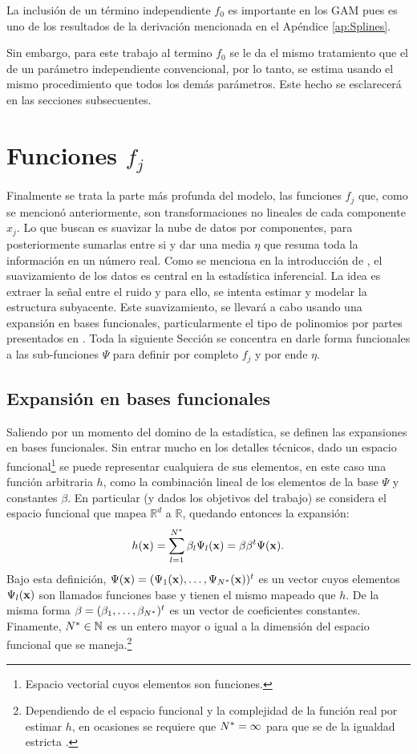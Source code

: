 \documentclass[../Main/Main.tex]{subfiles}
\begin{document}
La inclusión de un término independiente $f_0$ es importante en los GAM pues es uno de los resultados de la derivación mencionada en el Apéndice \ref{ap:Splines}. 


Sin embargo, para este trabajo al termino $f_0$ se le da el mismo tratamiento que el de un parámetro independiente convencional, por lo tanto, se estima usando el mismo procedimiento que todos los demás parámetros. Este hecho se esclarecerá en las secciones subsecuentes. 

\section{Funciones $f_j$} \label{sec:fj}
Finalmente se trata la parte más profunda del modelo, las funciones $f_j$  que, como se mencionó anteriormente, son transformaciones no lineales de cada componente $x_j$. Lo que buscan es suavizar la nube de datos por componentes, para posteriormente sumarlas entre si y dar una media $\eta$ que resuma toda la información en un número real. Como se menciona en la introducción de \citet{hardle2004semiparametric}, el suavizamiento de los datos es central en la estadística inferencial. La idea es extraer la señal entre el ruido y para ello, se intenta estimar y modelar la estructura subyacente. Este suavizamiento, se llevará a cabo usando una expansión en bases funcionales, particularmente el tipo de polinomios por partes presentados en \citet{mallik1998automatic}. Toda la siguiente Sección se concentra en darle forma funcionales a las sub-funciones $\Psi$ para definir por completo $f_j$ y por ende $\eta$. 

\subsection{Expansión en bases funcionales}
Saliendo por un momento del domino de la estadística, se definen las expansiones en bases funcionales. Sin entrar mucho en los detalles técnicos, dado un espacio funcional\footnote{Espacio vectorial cuyos elementos son funciones.} se puede representar cualquiera de sus elementos, en este caso una función arbitraria $h$, como la combinación lineal de los elementos de la base $\Psi$  y constantes $\beta$. En particular (y dados los objetivos del trabajo) se considera el espacio funcional que mapea $\mathbb{R}^d$ a $\mathbb{R}$, quedando entonces la expansión: 
\begin{align} 
	h(\mathbf{x}) = \sum_{l = 1}^{N^*} \beta_l\Psi_l(\mathbf{x}) = \beta{\beta}^t\Psi(\mathbf{x}). \label{ec:ExpansionBases}
\end{align}
Bajo esta definición, $\Psi(\mathbf{x}) = (\Psi_1(\mathbf{x}),\ldots,\Psi_{N^*}(\mathbf{x}))^t$ es un vector cuyos elementos $\Psi_l(\mathbf{x})$ son llamados funciones base y tienen el mismo mapeado que $h$. De la misma forma $\beta = (\beta_1,\ldots,\beta_{N^*})^t$ es un vector de coeficientes constantes. Finamente, $N^*\in\mathbb{N}$ es un entero mayor o igual a la dimensión del espacio funcional que se maneja.\footnote{Dependiendo de el espacio funcional y la complejidad de la función real por estimar $h$, en ocasiones se requiere que $N^* = \infty$ para que se de la igualdad estricta \autocite{bergstrom1985estimation}.}
\end{document}
